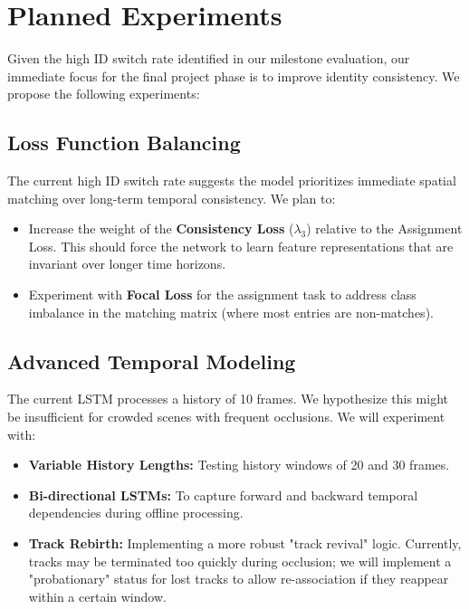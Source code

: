 \documentclass{article}
\begin{document}
\section{Planned Experiments}

Given the high ID switch rate identified in our milestone evaluation, our immediate focus for the final project phase is to improve identity consistency. We propose the following experiments:

\subsection{Loss Function Balancing}

The current high ID switch rate suggests the model prioritizes immediate spatial matching over long-term temporal consistency. We plan to:
\begin{itemize}
  \item Increase the weight of the \textbf{Consistency Loss} ($\lambda_3$) relative to the Assignment Loss. This should force the network to learn feature representations that are invariant over longer time horizons.
  \item Experiment with \textbf{Focal Loss} for the assignment task to address class imbalance in the matching matrix (where most entries are non-matches).
\end{itemize}

\subsection{Advanced Temporal Modeling}

The current LSTM processes a history of 10 frames. We hypothesize this might be insufficient for crowded scenes with frequent occlusions. We will experiment with:
\begin{itemize}
  \item \textbf{Variable History Lengths:} Testing history windows of 20 and 30 frames.
  \item \textbf{Bi-directional LSTMs:} To capture forward and backward temporal dependencies during offline processing.
  \item \textbf{Track Rebirth:} Implementing a more robust "track revival" logic. Currently, tracks may be terminated too quickly during occlusion; we will implement a "probationary" status for lost tracks to allow re-association if they reappear within a certain window.
\end{itemize}
\end{document}
